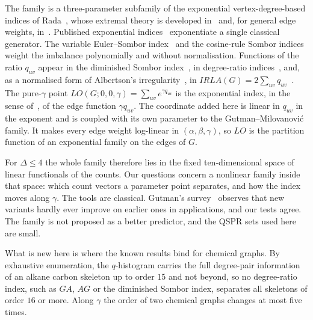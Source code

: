 \documentclass[a5paper, 10pt]{article}
\theoremstyle{plain}
\theoremstyle{remark}
\theoremstyle{definition}
\begin{document}
  The family is a three-parameter subfamily of the exponential
  vertex-degree-based indices of Rada~\cite{Rada2019ExpVDB}, whose
  extremal theory is developed
  in~\cite{CruzMonsalveRada2020, Sigarreta2022ExpVDB, GaoAMC2024} and, for general edge weights,
  in~\cite{HuMATCH2022}.
  Published exponential
  indices~\cite{DasMondal2024ExpGA, DasMondalRazaPal2025ExpISDD} exponentiate
  a single classical generator. The variable
  Euler--Sombor index~\cite{GutmanRedzepovicKizilirmakKulli2025EU} and
  the cosine-rule Sombor indices~\cite{NyauliBuragohain2026CoRSO} weight
  the imbalance polynomially and without normalisation. Functions of the ratio
  $q_{uv}$ appear in the diminished Sombor
  index~\cite{MovahediGutmanRedzepovicFurtula2026}, in degree-ratio
  indices~\cite{NyauliBuragohain2027DRSO, GutmanBuragohainNyauli2026},
  and, as a normalised form of Albertson's
  irregularity~\cite{Albertson1997, LinZhouWangMiao2022}, in
  $IRLA(G) = 2\sum_{uv} q_{uv}$~\cite{RetiSharafdini2018IRLA}. The
  pure-$\gamma$ point $LO(G;0,0,\gamma) = \sum_{uv} e^{\gamma q_{uv}}$
  is the exponential index, in the sense of~\cite{Rada2019ExpVDB}, of
  the edge function $\gamma q_{uv}$. The
  coordinate added here is linear in $q_{uv}$ in the exponent and is
  coupled with its own parameter to the Gutman--Milovanovi\'c family. It makes
  every edge weight log-linear in $(\alpha,\beta,\gamma)$, so $LO$ is
  the partition function of an exponential family on the edges of $G$.

  For $\Delta \le 4$ the whole family therefore lies in the fixed
  ten-dimensional space of linear functionals of the counts. Our questions
  concern a nonlinear family inside that space: which count vectors a
  parameter point separates, and how the index moves along $\gamma$.
  The tools are classical. Gutman's survey~\cite{Gutman2026SomborSurvey}
  observes that new variants hardly ever improve on earlier ones in
  applications, and our tests agree. The family is not proposed as a
  better predictor, and the QSPR sets used here are small.

  What is new here is where the known results bind for chemical graphs. By
  exhaustive enumeration, the $q$-histogram carries the full
  degree-pair information of an alkane carbon skeleton up to order $15$
  and not beyond, so no degree-ratio index, such as $GA$, $AG$ or the
  diminished Sombor index, separates all skeletons of order $16$ or more.
  Along $\gamma$ the order of two chemical graphs changes at most five
  times.
\end{document}

